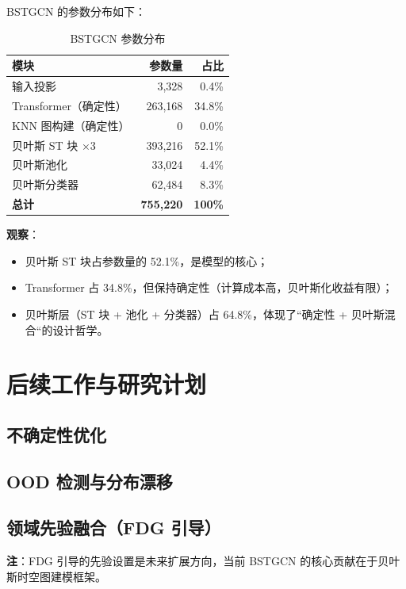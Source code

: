 BSTGCN 的参数分布如下：

\begin{table}[h]
\centering
\begin{tabular}{lrr}
\hline
\textbf{模块} & \textbf{参数量} & \textbf{占比} \\
\hline
输入投影 & 3,328 & 0.4\% \\
Transformer（确定性） & 263,168 & 34.8\% \\
KNN 图构建（确定性） & 0 & 0.0\% \\
贝叶斯 ST 块 ×3 & 393,216 & 52.1\% \\
贝叶斯池化 & 33,024 & 4.4\% \\
贝叶斯分类器 & 62,484 & 8.3\% \\
\hline
\textbf{总计} & \textbf{755,220} & \textbf{100\%} \\
\hline
\end{tabular}
\caption{BSTGCN 参数分布}
\end{table}

\textbf{观察}：
\begin{itemize}
  \item 贝叶斯 ST 块占参数量的 52.1\%，是模型的核心；
  \item Transformer 占 34.8\%，但保持确定性（计算成本高，贝叶斯化收益有限）；
  \item 贝叶斯层（ST 块 + 池化 + 分类器）占 64.8\%，体现了``确定性 + 贝叶斯混合``的设计哲学。
\end{itemize}

\section{后续工作与研究计划}

\subsection{不确定性优化}



\subsection{OOD 检测与分布漂移}


\subsection{领域先验融合（FDG 引导）}


\textbf{注}：FDG 引导的先验设置是未来扩展方向，当前 BSTGCN 的核心贡献在于贝叶斯时空图建模框架。

